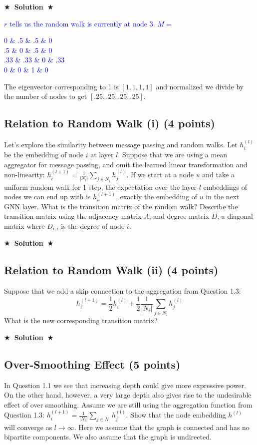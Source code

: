 \documentclass{article}
\numberwithin{figure}{section}
\newcommand{\Solution}[1]{{\medskip \color{red} \bf $\bigstar$~\sf \textbf{Solution}~$\bigstar$ \sf #1 } \bigskip}
\begin{document}
\Solution{\textcolor{blue}{ $r$ tells us the random walk is currently at node 3.
  $M =$ \begin{bmatrix}
  0 & .5 & .5 & 0 \\
  .5 & 0 & .5 & 0 \\
  .33 & .33 & 0 & .33 \\
  0 & 0 & 1 & 0
\end{bmatrix}
}

The eigenvector corresponding to 1 is $[1,1,1,1]$ and normalized we divide by the number of nodes to get $[.25,.25,.25,.25]$.}


\subsection{Relation to Random Walk (i) (4 points)}

Let’s explore the similarity between message passing and random walks. Let $h^{(l)}_i$ be the embedding of node $i$ at layer $l$. Suppose that we are using a mean aggregator for message passing, and omit the learned linear transformation and non-linearity: $h^{(l+1)}_i = \frac{1}{|N_i|} \sum_{j \in N_i} h^{(l)}_j$. If we start at a node $u$ and take a uniform random walk for 1 step, the expectation over the layer-$l$ embeddings
of nodes we can end up with is $h^{(l+1)}_u$, exactly the embedding of $u$ in the next GNN layer. What is the transition matrix of the random walk? Describe the transition matrix using the adjacency matrix $A$, and degree matrix $D$, a diagonal matrix where $D_{i,i}$ is the degree of node $i$.

\Solution{}


\subsection{Relation to Random Walk (ii) (4 points)}

Suppose that we add a skip connection to the aggregation from Question 1.3:
$$h^{(l+1)}_i = \frac{1}{2}h^{(l)}_i + \frac{1}{2}\frac{1}{|N_i|} \sum_{j \in N_i} h^{(l)}_j$$
What is the new corresponding transition matrix?

\Solution{}


\subsection{Over-Smoothing Effect (5 points)}

In Question 1.1 we see that increasing depth could give more expressive power.
On the other hand, however, a very large depth also gives rise to the undesirable
effect of over smoothing. Assume we are still using the aggregation function
from Question 1.3: $h^{(l+1)}_i = \frac{1}{|N_i|} \sum_{j \in N_i} h^{(l)}_j$. Show that the node embedding $h^{(l)}$ will converge as $l \rightarrow \infty$. Here we assume that the graph is connected and has no bipartite components. We also assume that the graph is undirected.
\end{document}
